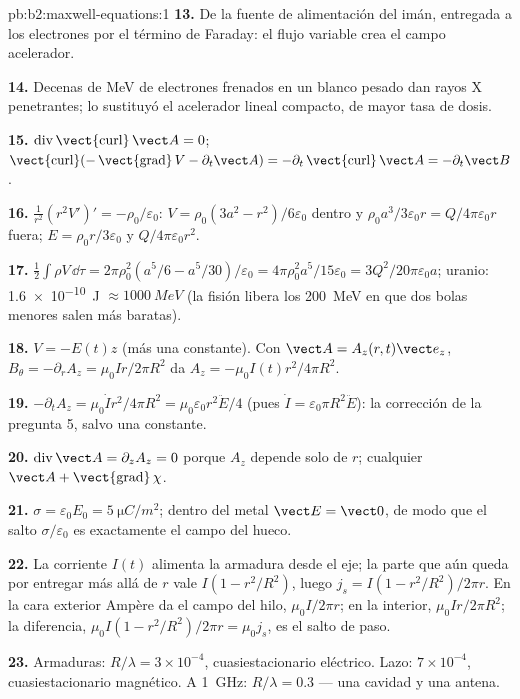 \begin{solution}{pb:b2:maxwell-equations:1}
\textbf{13.} De la fuente de alimentación del imán, entregada a los
electrones por el término de Faraday: el flujo variable crea el campo
acelerador.

\textbf{14.} Decenas de MeV de electrones frenados en un blanco pesado dan
rayos X penetrantes; lo sustituyó el acelerador lineal compacto, de mayor
tasa de dosis.

\textbf{15.} $\operatorname{div}\operatorname{\vect{curl}}\vect A = 0$; $\operatorname{\vect{curl}}(-\operatorname{\vect{grad}}
V - \partial_t\vect A) = -\partial_t\operatorname{\vect{curl}}\vect A = -\partial_t\vect B$.

\textbf{16.} $\frac1{r^2}(r^2V')' = -\rho_0/\varepsilon_0$: $V = \rho_0(3a^2 - r^2)/6\varepsilon_0$
dentro y $\rho_0a^3/3\varepsilon_0r = Q/4\pi\varepsilon_0r$ fuera; $E = \rho_0r/3\varepsilon_0$ y
$Q/4\pi\varepsilon_0r^2$.

\textbf{17.} $\tfrac12\int\rho V\,\dd\tau = 2\pi\rho_0^2(a^5/6 - a^5/30)/\varepsilon_0 = 4\pi\rho_0^2a^5/
15\varepsilon_0 = 3Q^2/20\pi\varepsilon_0a$; uranio: \qty{1.6e-10}{J} $\approx \qty{1000}{MeV}$ (la fisión
libera los \qty{200}{MeV} en que dos bolas menores salen más baratas).

\textbf{18.} $V = -E(t)z$ (más una constante). Con $\vect A = A_z(r, t)\vect e_z$,
$B_\theta = -\partial_rA_z = \mu_0Ir/2\pi R^2$ da $A_z = -\mu_0I(t)r^2/4\pi R^2$.

\textbf{19.} $-\partial_tA_z = \mu_0\dot Ir^2/4\pi R^2 = \mu_0\varepsilon_0r^2\ddot E/4$ (pues $\dot I =
\varepsilon_0\pi R^2\ddot E$): la corrección de la pregunta 5, salvo una constante.

\textbf{20.} $\operatorname{div}\vect A = \partial_zA_z = 0$ porque $A_z$ depende solo de
$r$; cualquier $\vect A + \operatorname{\vect{grad}}\chi$.

\textbf{21.} $\sigma = \varepsilon_0E_0 = \qty{5}{\micro C/m^2}$; dentro del metal $\vect E =
\vect 0$, de modo que el salto $\sigma/\varepsilon_0$ es exactamente el campo del hueco.

\textbf{22.} La corriente $I(t)$ alimenta la armadura desde el eje; la
parte que aún queda por entregar más allá de $r$ vale $I(1 - r^2/R^2)$, luego $j_s = I(1 -
r^2/R^2)/2\pi r$. En la cara exterior Ampère da el campo del hilo, $\mu_0I/
2\pi r$; en la interior, $\mu_0Ir/2\pi R^2$; la diferencia, $\mu_0I(1 -
r^2/R^2)/2\pi r = \mu_0j_s$, es el salto de paso.

\textbf{23.} Armaduras: $R/\lambda = 3 \times 10^{-4}$, cuasiestacionario eléctrico.
Lazo: $7 \times 10^{-4}$, cuasiestacionario magnético. A \qty{1}{GHz}: $R/\lambda = 0.3$
--- una cavidad y una antena.


\end{solution}
